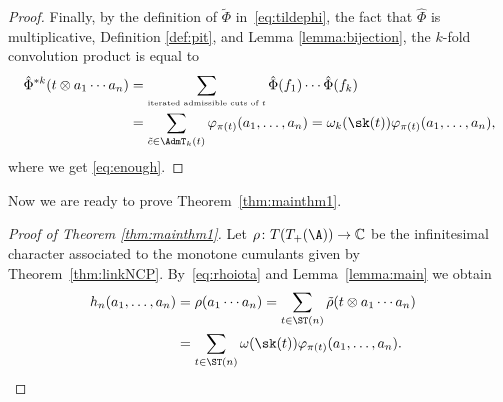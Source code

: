\begin{proof}
Finally, by the definition of $\tilde\Phi$ in~\eqref{eq:tildephi}, the fact that $\hat\Phi$ is multiplicative, Definition \ref{def:pit}, and Lemma \ref{lemma:bijection}, the $k$-fold convolution product is equal to
\begin{align*}
	\hat\Phi^{*k}(t\otimes a_1\cdots a_n)
	&= \sum_{\mbox{\tiny{iterated admissible cuts of $t$}}} \hat\Phi(f_1)\cdots \hat\Phi(f_k)\\
	&= \sum_{\tilde{c}\in \AdmT_k(t)} \varphi_{\pi(t)}(a_1,\dots,a_n)= \omega_k(\sk(t)) \varphi_{\pi(t)}(a_1,\dots,a_n),
\end{align*}
where we get \eqref{eq:enough}.
\end{proof}

Now we are ready to prove Theorem~\ref{thm:mainthm1}.

\begin{proof}[Proof of Theorem \ref{thm:mainthm1}]
Let $\rho\colon T(T_+(\A))\to\mathbb{C}$ be the infinitesimal character associated to the monotone cumulants given by Theorem~\ref{thm:linkNCP}. By~\eqref{eq:rhoiota} and Lemma~\ref{lemma:main} we obtain
\begin{align*}
h_n(a_1,\dots,a_n) &= \rho(a_1\cdots a_n)
= \sum_{t\in \ST(n)} \tilde\rho(t\otimes a_1\cdots a_n)
\\ &= \sum_{t\in \ST(n)} \omega(\sk(t))\varphi_{\pi(t)} (a_1,\dots,a_n).\tag*{\qed}
\end{align*}\renewcommand{\qed}{}
\end{proof}

